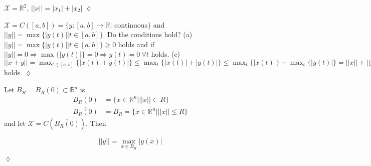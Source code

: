 \begin{example}
$\mathcal{X} = \mathbb{R}^2$, $||x||=|x_1|+|x_2|$
$\lozenge$
\end{example}

\begin{example}
$\mathcal{X} = C([a,b]) = \{y:[a,b]\to\mathbb{R} | \text{~continuous}\}$ and $||y|| = \max\{|y(t)| | t\in[a,b]\}$.
Do the conditions hold?
\newline
(a) $||y|| = \max\{|y(t)| | t\in[a,b]\}\geq 0$ holds and if $||y||=0 \Rightarrow \max\{|y(t)|\} = 0 \Rightarrow y(t)=0~\forall t$ holds.
\newline
(c) $||x+y|| = \max_{t\in[a,b]}\{|x(t)+y(t)|\} \leq \max_t\{|x(t)|+|y(t)|\} \leq \max_t\{|x(t)|\} + \max_t\{|y(t)|\} = ||x|| + ||y||$ holds.
$\lozenge$
\end{example}

\begin{example}
Let $B_R=B_R(0)\subset\mathbb{R}^n$ is
\begin{align*}
B_R(0) &= \{x\in\mathbb{R}^n | ||x||\subset R\} \\
\overline{B_R(0)} &= \overline{B_R} = \{x\in\mathbb{R}^n | ||x||\leq R\}
\end{align*}
and let $\mathcal{X}=C(\overline{B_R(0)})$.
Then

\begin{equation*}
||y||=\max_{x\in B_R} |y(x)|
\end{equation*}

$\lozenge$
\end{example}%
